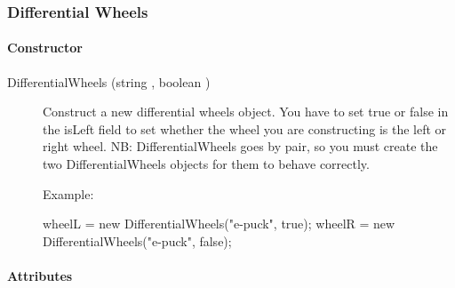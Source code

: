 \subsubsection{Differential Wheels}

\paragraph{Constructor}

\noindent
\begin{description}
\item[{DifferentialWheels (string , boolean )}]
  Construct a new differential wheels object. You have to set true or
  false in the isLeft field to set whether the wheel you are
  constructing is the left or right wheel.  NB: DifferentialWheels
  goes by pair, so you must create the two DifferentialWheels objects
  for them to behave correctly.

  Example:

\begin{urbifixme}
wheelL = new DifferentialWheels("e-puck", true);
wheelR = new DifferentialWheels("e-puck", false);
\end{urbifixme}
\end{description}

\paragraph{Attributes}

